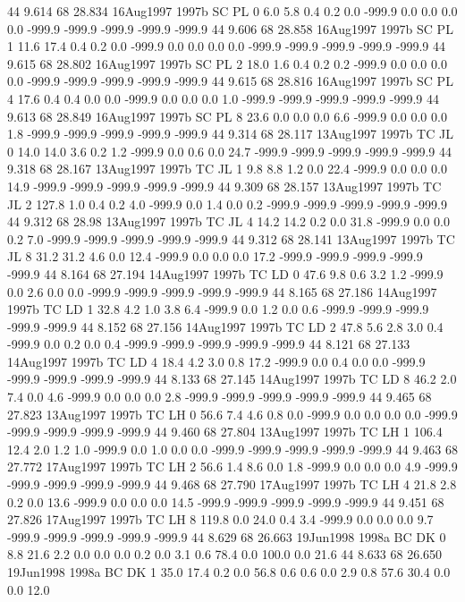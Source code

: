 44 9.614	68 28.834	16Aug1997	1997b	SC	PL	0	6.0	5.8	0.4	0.2	0.0	-999.9	0.0	0.0	0.0	0.0	-999.9	-999.9	-999.9	-999.9	-999.9
44 9.606	68 28.858	16Aug1997	1997b	SC	PL	1	11.6	17.4	0.4	0.2	0.0	-999.9	0.0	0.0	0.0	0.0	-999.9	-999.9	-999.9	-999.9	-999.9
44 9.615	68 28.802	16Aug1997	1997b	SC	PL	2	18.0	1.6	0.4	0.2	0.2	-999.9	0.0	0.0	0.0	0.0	-999.9	-999.9	-999.9	-999.9	-999.9
44 9.615	68 28.816	16Aug1997	1997b	SC	PL	4	17.6	0.4	0.4	0.0	0.0	-999.9	0.0	0.0	0.0	1.0	-999.9	-999.9	-999.9	-999.9	-999.9
44 9.613	68 28.849	16Aug1997	1997b	SC	PL	8	23.6	0.0	0.0	0.0	6.6	-999.9	0.0	0.0	0.0	1.8	-999.9	-999.9	-999.9	-999.9	-999.9
44 9.314	68 28.117	13Aug1997	1997b	TC	JL	0	14.0	14.0	3.6	0.2	1.2	-999.9	0.0	0.6	0.0	24.7	-999.9	-999.9	-999.9	-999.9	-999.9
44 9.318	68 28.167	13Aug1997	1997b	TC	JL	1	9.8	8.8	1.2	0.0	22.4	-999.9	0.0	0.0	0.0	14.9	-999.9	-999.9	-999.9	-999.9	-999.9
44 9.309	68 28.157	13Aug1997	1997b	TC	JL	2	127.8	1.0	0.4	0.2	4.0	-999.9	0.0	1.4	0.0	0.2	-999.9	-999.9	-999.9	-999.9	-999.9
44 9.312	68 28.98	13Aug1997	1997b	TC	JL	4	14.2	14.2	0.2	0.0	31.8	-999.9	0.0	0.0	0.2	7.0	-999.9	-999.9	-999.9	-999.9	-999.9
44 9.312	68 28.141	13Aug1997	1997b	TC	JL	8	31.2	31.2	4.6	0.0	12.4	-999.9	0.0	0.0	0.0	17.2	-999.9	-999.9	-999.9	-999.9	-999.9
44 8.164	68 27.194	14Aug1997	1997b	TC	LD	0	47.6	9.8	0.6	3.2	1.2	-999.9	0.0	2.6	0.0	0.0	-999.9	-999.9	-999.9	-999.9	-999.9
44 8.165	68 27.186	14Aug1997	1997b	TC	LD	1	32.8	4.2	1.0	3.8	6.4	-999.9	0.0	1.2	0.0	0.6	-999.9	-999.9	-999.9	-999.9	-999.9
44 8.152	68 27.156	14Aug1997	1997b	TC	LD	2	47.8	5.6	2.8	3.0	0.4	-999.9	0.0	0.2	0.0	0.4	-999.9	-999.9	-999.9	-999.9	-999.9
44 8.121	68 27.133	14Aug1997	1997b	TC	LD	4	18.4	4.2	3.0	0.8	17.2	-999.9	0.0	0.4	0.0	0.0	-999.9	-999.9	-999.9	-999.9	-999.9
44 8.133	68 27.145	14Aug1997	1997b	TC	LD	8	46.2	2.0	7.4	0.0	4.6	-999.9	0.0	0.0	0.0	2.8	-999.9	-999.9	-999.9	-999.9	-999.9
44 9.465	68 27.823	13Aug1997	1997b	TC	LH	0	56.6	7.4	4.6	0.8	0.0	-999.9	0.0	0.0	0.0	0.0	-999.9	-999.9	-999.9	-999.9	-999.9
44 9.460	68 27.804	13Aug1997	1997b	TC	LH	1	106.4	12.4	2.0	1.2	1.0	-999.9	0.0	1.0	0.0	0.0	-999.9	-999.9	-999.9	-999.9	-999.9
44 9.463	68 27.772	17Aug1997	1997b	TC	LH	2	56.6	1.4	8.6	0.0	1.8	-999.9	0.0	0.0	0.0	4.9	-999.9	-999.9	-999.9	-999.9	-999.9
44 9.468	68 27.790	17Aug1997	1997b	TC	LH	4	21.8	2.8	0.2	0.0	13.6	-999.9	0.0	0.0	0.0	14.5	-999.9	-999.9	-999.9	-999.9	-999.9
44 9.451	68 27.826	17Aug1997	1997b	TC	LH	8	119.8	0.0	24.0	0.4	3.4	-999.9	0.0	0.0	0.0	9.7	-999.9	-999.9	-999.9	-999.9	-999.9
44 8.629	68 26.663	19Jun1998	1998a	BC	DK	0	8.8	21.6	2.2	0.0	0.0	0.0	0.2	0.0	3.1	0.6	78.4	0.0	100.0	0.0	21.6
44 8.633	68 26.650	19Jun1998	1998a	BC	DK	1	35.0	17.4	0.2	0.0	56.8	0.6	0.6	0.0	2.9	0.8	57.6	30.4	0.0	0.0	12.0
